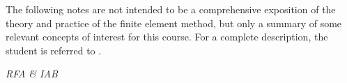 \begin{kaobox}[frametitle=Disclaimer]	
	The following notes are not intended to be a comprehensive
	exposition of the theory and practice of the finite element method,
	but only a summary of some relevant concepts of interest for this
	course. For a complete description, the student is referred to 
	\cite{ern-guermond,ciarlet,Reddy,Brenner}.
\end{kaobox}

\begin{flushright}
	\textit{RFA \& IAB} 
\end{flushright}

